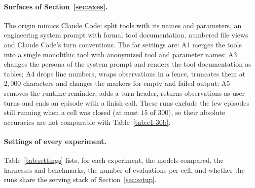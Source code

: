\documentclass{article} %
\newcommand{\claudecode}{Claude Code}
\begin{document}
\paragraph{Surfaces of Section~\ref{sec:axes}.} The origin mimics
\claudecode{}: split tools with its names and parameters, an engineering
system prompt with formal tool documentation, numbered file views and
\claudecode{}'s turn conventions. The far settings are: A1 merges the tools
into a single monolithic tool with anonymized tool and parameter names; A3
changes the persona of the system prompt and renders the tool documentation
as tables; A4 drops line numbers, wraps observations in a fence, truncates
them at $2{,}000$ characters and changes the markers for empty and failed
output; A5 removes the runtime reminder, adds a turn header, returns
observations as user turns and ends an episode with a finish call. These runs
exclude the few episodes still running when a cell was closed (at most $15$
of $300$), so their absolute accuracies are not comparable with
Table~\ref{tab:e1-30b}.

\paragraph{Settings of every experiment.} Table~\ref{tab:settings} lists, for
each experiment, the models compared, the harnesses and benchmarks, the number
of evaluations per cell, and whether the runs share the serving stack of
Section~\ref{sec:setup}.
\end{document}
